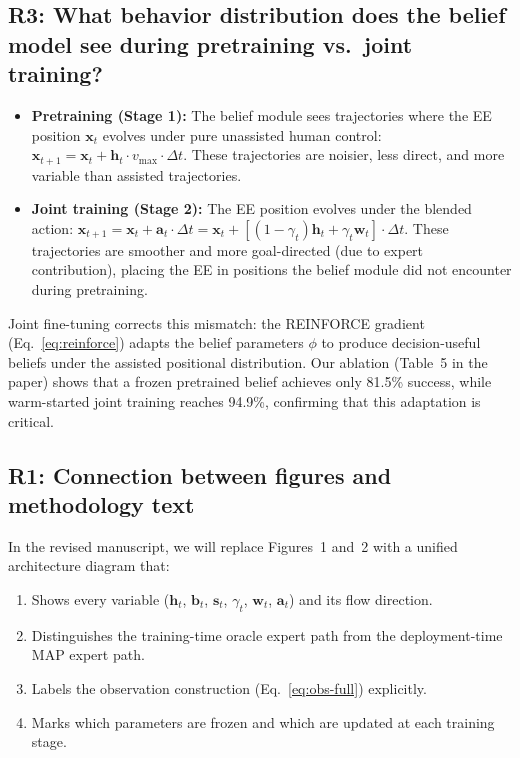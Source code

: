 \documentclass[11pt]{article}
\newcommand{\bvec}{\mathbf{b}_t}
\newcommand{\svec}{\mathbf{s}_t}
\newcommand{\hvec}{\mathbf{h}_t}
\newcommand{\wvec}{\mathbf{w}_t}
\newcommand{\avec}{\mathbf{a}_t}
\begin{document}
\subsection{R3: What behavior distribution does the belief model see during pretraining vs.\ joint training?}

\begin{itemize}
    \item \textbf{Pretraining (Stage 1):}
    The belief module sees trajectories where the EE position $\mathbf{x}_t$ evolves under pure unassisted human control: $\mathbf{x}_{t+1} = \mathbf{x}_t + \hvec \cdot v_{\max} \cdot \Delta t$.
    These trajectories are noisier, less direct, and more variable than assisted trajectories.

    \item \textbf{Joint training (Stage 2):}
    The EE position evolves under the blended action: $\mathbf{x}_{t+1} = \mathbf{x}_t + \avec \cdot \Delta t = \mathbf{x}_t + [(1-\gamma_t)\hvec + \gamma_t \wvec] \cdot \Delta t$.
    These trajectories are smoother and more goal-directed (due to expert contribution), placing the EE in positions the belief module did not encounter during pretraining.
\end{itemize}

Joint fine-tuning corrects this mismatch: the REINFORCE gradient (Eq.~\ref{eq:reinforce}) adapts the belief parameters $\phi$ to produce decision-useful beliefs under the assisted positional distribution.  Our ablation (Table~5 in the paper) shows that a frozen pretrained belief achieves only 81.5\% success, while warm-started joint training reaches 94.9\%, confirming that this adaptation is critical.

\subsection{R1: Connection between figures and methodology text}

In the revised manuscript, we will replace Figures~1 and~2 with a unified architecture diagram that:
\begin{enumerate}
    \item Shows every variable ($\hvec$, $\bvec$, $\svec$, $\gamma_t$, $\wvec$, $\avec$) and its flow direction.
    \item Distinguishes the training-time oracle expert path from the deployment-time MAP expert path.
    \item Labels the observation construction (Eq.~\ref{eq:obs-full}) explicitly.
    \item Marks which parameters are frozen and which are updated at each training stage.
\end{enumerate}
\end{document}
